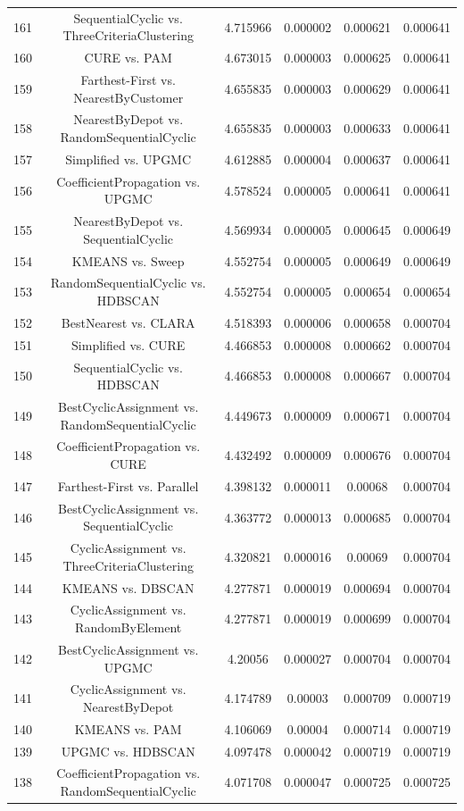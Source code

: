 \documentclass[a4paper,10pt]{article}
\begin{document}
\begin{landscape}
\begin{table}[!htp]
\begin{tabular}{cccccc}
161&SequentialCyclic vs. ThreeCriteriaClustering&4.715966&0.000002&0.000621&0.000641\\
160&CURE vs. PAM&4.673015&0.000003&0.000625&0.000641\\
159&Farthest-First vs. NearestByCustomer&4.655835&0.000003&0.000629&0.000641\\
158&NearestByDepot vs. RandomSequentialCyclic&4.655835&0.000003&0.000633&0.000641\\
157&Simplified vs. UPGMC&4.612885&0.000004&0.000637&0.000641\\
156&CoefficientPropagation vs. UPGMC&4.578524&0.000005&0.000641&0.000641\\
155&NearestByDepot vs. SequentialCyclic&4.569934&0.000005&0.000645&0.000649\\
154&KMEANS vs. Sweep&4.552754&0.000005&0.000649&0.000649\\
153&RandomSequentialCyclic vs. HDBSCAN&4.552754&0.000005&0.000654&0.000654\\
152&BestNearest vs. CLARA&4.518393&0.000006&0.000658&0.000704\\
151&Simplified vs. CURE&4.466853&0.000008&0.000662&0.000704\\
150&SequentialCyclic vs. HDBSCAN&4.466853&0.000008&0.000667&0.000704\\
149&BestCyclicAssignment vs. RandomSequentialCyclic&4.449673&0.000009&0.000671&0.000704\\
148&CoefficientPropagation vs. CURE&4.432492&0.000009&0.000676&0.000704\\
147&Farthest-First vs. Parallel&4.398132&0.000011&0.00068&0.000704\\
146&BestCyclicAssignment vs. SequentialCyclic&4.363772&0.000013&0.000685&0.000704\\
145&CyclicAssignment vs. ThreeCriteriaClustering&4.320821&0.000016&0.00069&0.000704\\
144&KMEANS vs. DBSCAN&4.277871&0.000019&0.000694&0.000704\\
143&CyclicAssignment vs. RandomByElement&4.277871&0.000019&0.000699&0.000704\\
142&BestCyclicAssignment vs. UPGMC&4.20056&0.000027&0.000704&0.000704\\
141&CyclicAssignment vs. NearestByDepot&4.174789&0.00003&0.000709&0.000719\\
140&KMEANS vs. PAM&4.106069&0.00004&0.000714&0.000719\\
139&UPGMC vs. HDBSCAN&4.097478&0.000042&0.000719&0.000719\\
138&CoefficientPropagation vs. RandomSequentialCyclic&4.071708&0.000047&0.000725&0.000725\\

\end{tabular}
\end{table}
\end{landscape}
\end{document}

